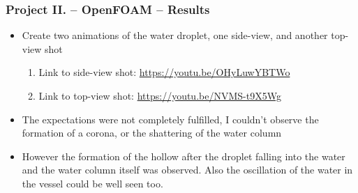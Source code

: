 \begin{frame}
\frametitle{Project II. -- OpenFOAM -- Results}

\begin{itemize}
	\item<1-> Create two animations of the water droplet, one side-view, and another top-view shot
	\begin{enumerate}
		\item<1-> Link to side-view shot: \url{https://youtu.be/OHyLuwYBTWo}
		\item<1-> Link to top-view shot: \url{https://youtu.be/NVMS-t9X5Wg}
	\end{enumerate}
	\item<2-> The expectations were not completely fulfilled, I couldn't observe the formation of a corona, or the shattering of the water column
	\item<2-> However the formation of the hollow after the droplet falling into the water and the water column itself was observed. Also the oscillation of the water in the vessel could be well seen too.
\end{itemize}

\end{frame}


